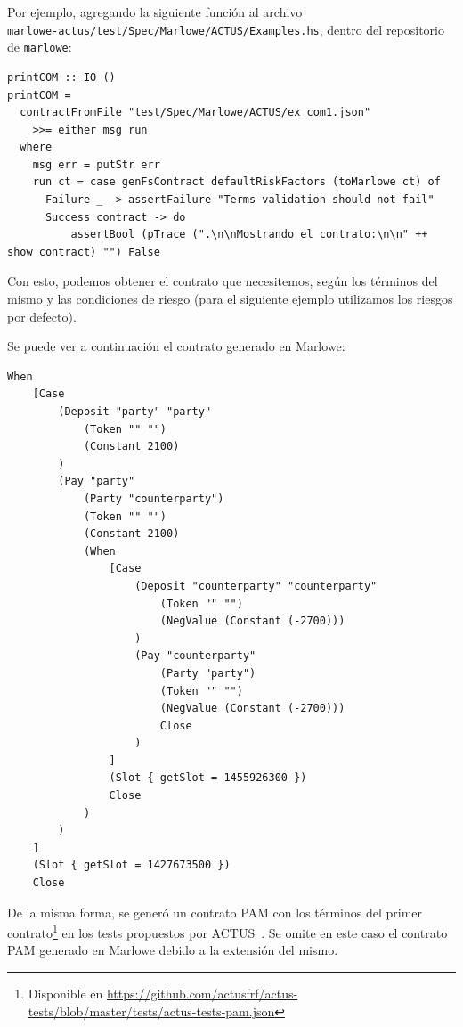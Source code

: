 \documentclass[12pt]{book}
\begin{document}
Por ejemplo, agregando la siguiente función al archivo\\ \texttt{marlowe-actus/test/Spec/Marlowe/ACTUS/Examples.hs}, dentro del repositorio de \texttt{marlowe}:

\begin{lstlisting}[style=Haskell-cardano, caption=Función para imprimir contratos en Marlowe.]
printCOM :: IO ()
printCOM =
  contractFromFile "test/Spec/Marlowe/ACTUS/ex_com1.json"
    >>= either msg run
  where
    msg err = putStr err
    run ct = case genFsContract defaultRiskFactors (toMarlowe ct) of
      Failure _ -> assertFailure "Terms validation should not fail"
      Success contract -> do
          assertBool (pTrace (".\n\nMostrando el contrato:\n\n" ++ show contract) "") False
\end{lstlisting}

Con esto, podemos obtener el contrato que necesitemos, según los términos del mismo y las condiciones de riesgo (para el siguiente ejemplo utilizamos los riesgos por defecto).

Se puede ver a continuación el contrato generado en Marlowe:

\begin{lstlisting}[style=Haskell-cardano, language=Marlowe, caption=Contrato COM4 en Marlowe.]
When
    [Case
        (Deposit "party" "party"
            (Token "" "")
            (Constant 2100)
        )
        (Pay "party"
            (Party "counterparty")
            (Token "" "")
            (Constant 2100)
            (When
                [Case
                    (Deposit "counterparty" "counterparty"
                        (Token "" "")
                        (NegValue (Constant (-2700)))
                    )
                    (Pay "counterparty"
                        (Party "party")
                        (Token "" "")
                        (NegValue (Constant (-2700))) 
                        Close
                    )
                ]
                (Slot { getSlot = 1455926300 })
                Close
            )
        )
    ]
    (Slot { getSlot = 1427673500 })
    Close
\end{lstlisting}

De la misma forma, se generó un contrato PAM con los términos del primer contrato\footnote{Disponible en \url{https://github.com/actusfrf/actus-tests/blob/master/tests/actus-tests-pam.json}} en los tests propuestos por ACTUS~\cite{ACTUS_Tests}. Se omite en este caso el contrato PAM generado en Marlowe debido a la extensión del mismo.
\end{document}
